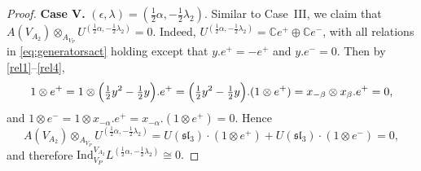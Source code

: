 \documentclass[12pt,a4paper,reqno]{amsart}
\numberwithin{equation}{section}
\numberwithin{equation}{section}
\theoremstyle{definition}
\newtheorem{remark}[thm]{Remark}
\def \C {\mathbb{C}}
\def\la{\lambda}
\def\hr{\hookrightarrow}
\def \op {\oplus}
\def \g {\mathfrak{g}}
\def \h {\mathfrak{h}}
\def\fn{\mathfrak{n}}
\begin{document}
\begin{proof}
			
			\noindent	\textbf{Case V.} $(\epsilon, \lambda) = \left(\tfrac{1}{2}\alpha, -\tfrac{1}{2}\lambda_2\right)$. 
			Similar to Case~III, we claim that 
			$A(V_{A_2}) \otimes_{A_{V_P}} U^{(\frac{1}{2}\alpha, -\frac{1}{2}\lambda_2)} = 0$. 
			Indeed, $U^{(\frac{1}{2}\alpha, -\frac{1}{2}\lambda_2)} = \C e^+ \oplus \C e^-$, 
			with all relations in \eqref{eq:generatorsact} holding except that 
			$y.e^+ = -e^+$ and $y.e^- = 0$. 
			Then by \eqref{rel1}--\eqref{rel4},
			\[
			1 \otimes e^+ 
			= 1 \otimes \Bigl(\tfrac{1}{2}y^2 - \tfrac{1}{2}y\Bigr).e^+ 
			= \Bigl(\tfrac{1}{2}y^2 - \tfrac{1}{2}y\Bigr).(1 \otimes e^+) 
			= x_{-\beta} \otimes x_{\beta}.e^+ = 0,
			\]
			and 
			$1 \otimes e^- = 1 \otimes x_{-\alpha}.e^+ 
			= x_{-\alpha}.(1 \otimes e^+) = 0$. 
			Hence
			\[
			A(V_{A_2}) \otimes_{A_{V_P}} 
			U^{(\frac{1}{2}\alpha, -\frac{1}{2}\lambda_2)} 
			= U(\mathfrak{sl}_3) \cdot (1 \otimes e^+) 
			+ U(\mathfrak{sl}_3) \cdot (1 \otimes e^-) 
			= 0,
			\]
			and therefore
			$
			\mathrm{Ind}^{V_{A_2}}_{V_P} L^{(\frac{1}{2}\alpha, -\frac{1}{2}\lambda_2)}  \cong 0.
			$
		\end{proof}
		
		
		
		
\end{document}
